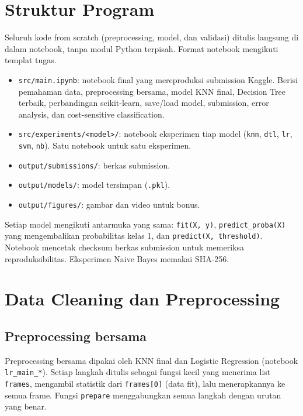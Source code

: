 \section{Struktur Program}
Seluruh kode from scratch (preprocessing, model, dan validasi) ditulis langsung di dalam notebook, tanpa modul Python terpisah. Format notebook mengikuti templat tugas.
\begin{itemize}
  \item \texttt{src/main.ipynb}: notebook final yang mereproduksi submission Kaggle. Berisi pemahaman data, preprocessing bersama, model KNN final, Decision Tree terbaik, perbandingan scikit-learn, save/load model, submission, error analysis, dan cost-sensitive classification.
  \item \texttt{src/experiments/<model>/}: notebook eksperimen tiap model (\texttt{knn}, \texttt{dtl}, \texttt{lr}, \texttt{svm}, \texttt{nb}). Satu notebook untuk satu eksperimen.
  \item \texttt{output/submissions/}: berkas submission.
  \item \texttt{output/models/}: model tersimpan (\texttt{.pkl}).
  \item \texttt{output/figures/}: gambar dan video untuk bonus.
\end{itemize}
Setiap model mengikuti antarmuka yang sama: \texttt{fit(X, y)}, \texttt{predict\_proba(X)} yang mengembalikan probabilitas kelas 1, dan \texttt{predict(X, threshold)}. Notebook mencetak checksum berkas submission untuk memeriksa reproduksibilitas. Eksperimen Naive Bayes memakai SHA-256.

\section{Data Cleaning dan Preprocessing}

\subsection{Preprocessing bersama}
Preprocessing bersama dipakai oleh KNN final dan Logistic Regression (notebook \texttt{lr\_main\_*}). Setiap langkah ditulis sebagai fungsi kecil yang menerima list \texttt{frames}, mengambil statistik dari \texttt{frames[0]} (data fit), lalu menerapkannya ke semua frame. Fungsi \texttt{prepare} menggabungkan semua langkah dengan urutan yang benar.

